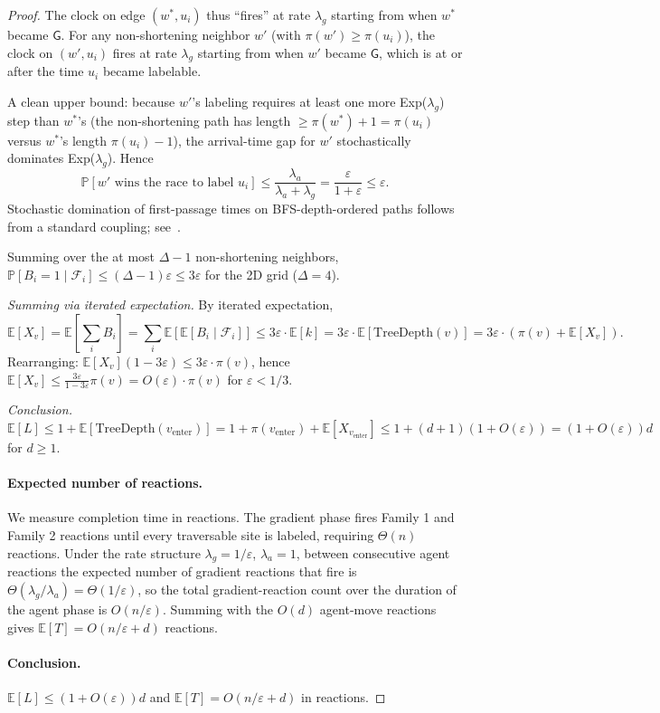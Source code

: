 \documentclass[11pt]{article}
\theoremstyle{plain}
\theoremstyle{definition}
\theoremstyle{remark}
\newcommand{\Pr}{\mathbb{P}}
\begin{document}
\begin{proof}
The clock on edge $(w^*, u_i)$ thus ``fires'' at rate $\lambda_g$ starting from when $w^*$ became $\mathsf{G}$. For any non-shortening neighbor $w'$ (with $\pi(w') \geq \pi(u_i)$), the clock on $(w', u_i)$ fires at rate $\lambda_g$ starting from when $w'$ became $\mathsf{G}$, which is at or after the time $u_i$ became labelable.

A clean upper bound: because $w'$'s labeling requires at least one more Exp($\lambda_g$) step than $w^*$'s (the non-shortening path has length $\geq \pi(w^*) + 1 = \pi(u_i)$ versus $w^*$'s length $\pi(u_i) - 1$), the arrival-time gap for $w'$ stochastically dominates Exp($\lambda_g$). Hence
\[
\Pr[w' \text{ wins the race to label } u_i] \leq \frac{\lambda_a}{\lambda_a + \lambda_g} = \frac{\varepsilon}{1 + \varepsilon} \leq \varepsilon.
\]
Stochastic domination of first-passage times on BFS-depth-ordered paths follows from a standard coupling; see~\cite[Ch.~VII]{feller1971}.

Summing over the at most $\Delta - 1$ non-shortening neighbors, $\Pr[B_i = 1 \mid \mathcal{F}_i] \leq (\Delta - 1) \varepsilon \leq 3\varepsilon$ for the 2D grid ($\Delta = 4$).

\emph{Summing via iterated expectation.} By iterated expectation,
\[
\mathbb{E}[X_v] = \mathbb{E}\left[\sum_i B_i\right] = \sum_i \mathbb{E}[\mathbb{E}[B_i \mid \mathcal{F}_i]] \leq 3\varepsilon \cdot \mathbb{E}[k] = 3\varepsilon \cdot \mathbb{E}[\mathrm{TreeDepth}(v)] = 3\varepsilon \cdot (\pi(v) + \mathbb{E}[X_v]).
\]
Rearranging: $\mathbb{E}[X_v] (1 - 3\varepsilon) \leq 3\varepsilon \cdot \pi(v)$, hence $\mathbb{E}[X_v] \leq \frac{3\varepsilon}{1 - 3\varepsilon} \pi(v) = O(\varepsilon) \cdot \pi(v)$ for $\varepsilon < 1/3$.

\emph{Conclusion.} $\mathbb{E}[L] \leq 1 + \mathbb{E}[\mathrm{TreeDepth}(v_{\text{enter}})] = 1 + \pi(v_{\text{enter}}) + \mathbb{E}[X_{v_{\text{enter}}}] \leq 1 + (d + 1)(1 + O(\varepsilon)) = (1 + O(\varepsilon)) d$ for $d \geq 1$.

\paragraph{Expected number of reactions.} We measure completion time in reactions. The gradient phase fires Family 1 and Family 2 reactions until every traversable site is labeled, requiring $\Theta(n)$ reactions. Under the rate structure $\lambda_g = 1/\varepsilon$, $\lambda_a = 1$, between consecutive agent reactions the expected number of gradient reactions that fire is $\Theta(\lambda_g / \lambda_a) = \Theta(1/\varepsilon)$, so the total gradient-reaction count over the duration of the agent phase is $O(n/\varepsilon)$. Summing with the $O(d)$ agent-move reactions gives $\mathbb{E}[T] = O(n/\varepsilon + d)$ reactions.

\paragraph{Conclusion.} $\mathbb{E}[L] \leq (1 + O(\varepsilon)) d$ and $\mathbb{E}[T] = O(n/\varepsilon + d)$ in reactions.
\end{proof}
\end{document}
